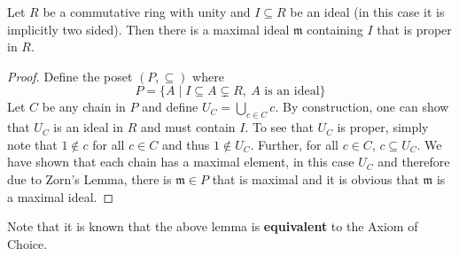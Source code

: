 \begin{lemma}
    Let $R$ be a commutative ring with unity and $I\subseteq R$ be an ideal (in this case it is implicitly two sided). Then there is a maximal ideal $\mathfrak{m}$ containing $I$ that is proper in $R$.
\end{lemma}
\begin{proof}
    Define the poset $(P,\subseteq)$ where
    \begin{equation*}
        P = \{A\mid I\subseteq A\subsetneq R,~A\text{ is an ideal}\}
    \end{equation*}
    Let $C$ be any chain in $P$ and define $U_C = \bigcup_{c\in C}c$. By construction, one can show that $U_C$ is an ideal in $R$ and must contain $I$. To see that $U_C$ is proper, simply note that $1\notin c$ for all $c\in C$ and thus $1\notin U_C$. Further, for all $c\in C$, $c\subseteq U_C$. We have shown that each chain has a maximal element, in this case $U_C$ and therefore due to Zorn's Lemma, there is $\mathfrak{m}\in P$ that is maximal and it is obvious that $\mathfrak{m}$ is a maximal ideal.
\end{proof}

Note that it is known that the above lemma is \textbf{equivalent} to the Axiom of Choice.